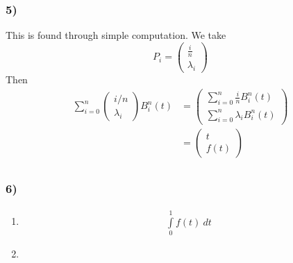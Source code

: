 \subsubsection{5)}
This is found through simple computation. We take 
\[
P_i = \begin{pmatrix*}
    \frac{ i }{ n  }   \\
    \lambda_i   
\end{pmatrix*}
\]
Then 
\begin{align*}
    \sum_{i=0}^{n } \begin{pmatrix*}
        i/n   \\
        \lambda_i   
    \end{pmatrix*}
    B _{ i  }^{ n  } (t) &= \begin{pmatrix*}
        \sum_{i=0}^{n } \frac{ i }{ n  } B _{ i  }^{ n  } (t)   \\
        \sum_{i=0}^{n } \lambda_i B _{ i  }^{ n  } (t)   
    \end{pmatrix*} \\ 
     &= \begin{pmatrix*}
         t  \\
         f(t)  
     \end{pmatrix*}
      \\ 
\end{align*}

\subsubsection{6)}
\begin{enumerate}
    \item 
    \begin{align*}
        \int\limits_{0}^{1} f(t) \ dt
    \end{align*}
\item 
\end{enumerate}

